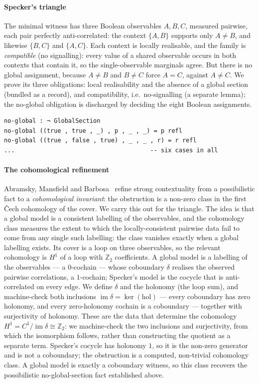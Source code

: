 \documentclass{lmcs}
\begin{document}
\paragraph{Specker's triangle}
The minimal witness has three Boolean observables $A, B, C$, measured pairwise, each pair perfectly anti-correlated: the context $\{A,B\}$ supports only $A \neq B$, and likewise $\{B,C\}$ and $\{A,C\}$.
Each context is locally realisable, and the family is \emph{compatible} (no signalling): every value of a shared observable occurs in both contexts that contain it, so the single-observable marginals agree.
But there is no global assignment, because $A \neq B$ and $B \neq C$ force $A = C$, against $A \neq C$.
We prove its three obligations: local realisability and the absence of a global section (bundled as a record), and compatibility, i.e.\ no-signalling (a separate lemma); the no-global obligation is discharged by deciding the eight Boolean assignments.
\begin{lstlisting}
no-global : ¬ GlobalSection
no-global ((true , true , _) , p , _ , _) = p refl
no-global ((true , false , true) , _ , _ , r) = r refl
...                                      -- six cases in all
\end{lstlisting}

\paragraph{The cohomological refinement}
Abramsky, Mansfield and Barbosa~\cite{abramsky-mansfield-barbosa-2012} refine strong contextuality from a possibilistic fact to a \emph{cohomological invariant}: the obstruction is a non-zero class in the first \v{C}ech cohomology of the cover.
We carry this out for the triangle.
The idea is that a global model is a consistent labelling of the observables, and the cohomology class measures the extent to which the locally-consistent pairwise data fail to come from any single such labelling: the class vanishes exactly when a global labelling exists.
Its cover is a loop on three observables, so the relevant cohomology is $H^1$ of a loop with $\mathbb{Z}_2$ coefficients.
A global model is a labelling of the observables --- a $0$-cochain --- whose coboundary $\delta$ realises the observed pairwise correlations, a $1$-cochain; Specker's model is the cocycle that is anti-correlated on every edge.
We define $\delta$ and the holonomy (the loop sum), and machine-check both inclusions $\operatorname{im}\delta = \ker(\mathrm{hol})$ --- every coboundary has zero holonomy, and every zero-holonomy cochain is a coboundary --- together with surjectivity of holonomy.
These are the data that determine the cohomology $H^1 = C^1/\operatorname{im}\delta \cong \mathbb{Z}_2$: we machine-check the two inclusions and surjectivity, from which the isomorphism follows, rather than constructing the quotient as a separate term.
Specker's cocycle has holonomy $1$, so it is the non-zero generator and is not a coboundary; the obstruction is a computed, non-trivial cohomology class.
A global model is exactly a coboundary witness, so this class recovers the possibilistic no-global-section fact established above.
\end{document}
